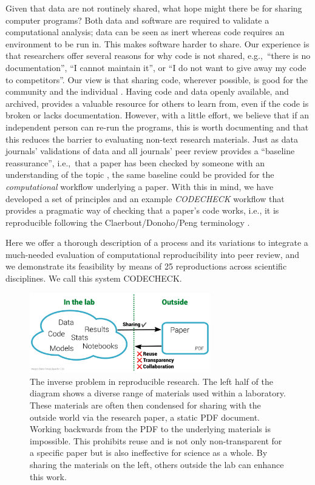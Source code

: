 \documentclass[12pt]{article}
\newcommand{\rev}[1]{\textit{#1}}
\begin{document}
Given that data are not routinely shared, what hope might there be for
sharing computer programs?  Both data and software are required to
validate a computational analysis; data can be seen as inert whereas
code requires an environment to be run in.  This makes software harder
to share.  Our experience is that researchers offer several reasons
for why code is not shared, e.g.,~``there is no documentation'', ``I
cannot maintain it'', or ``I do not want to give away my code to
competitors''.  Our view is that sharing code, wherever possible, is
good for the community and the individual
\cite{Barnes2010-iv,markowetz_five_2015}.  Having code and data openly
available, and archived, provides a valuable resource for others to
learn from, even if the code is broken or lacks documentation.
However, with a little effort, we believe that if an independent
person can re-run the programs, this is worth documenting and that
this reduces the barrier to evaluating non-text research materials.
Just as data journals' validations of data and all journals' peer
review provides a ``baseline reassurance'', i.e.,~that a paper has
been checked by someone with an understanding of the topic
\cite{fyfe_mission_2019}, the same baseline could be provided for the
\rev{computational} workflow underlying a paper.  With this in mind, we have developed a
set of principles and an example \rev{CODECHECK} workflow that provides a pragmatic
way of checking that a paper's code works, i.e., it is reproducible
following the Claerbout/Donoho/Peng terminology
\cite{barba_terminologies_2018}.

Here we offer a thorough description of a process and its variations
to integrate a much-needed evaluation of computational reproducibility
into peer review, and we demonstrate its feasibility by means of 25
reproductions across scientific disciplines.  We call this system
CODECHECK.

\begin{figure}
  \centering
  \includegraphics[width=0.7\textwidth]{figs/rr.pdf}
  \caption{The inverse problem in reproducible research. The left
  half of the diagram shows a diverse range of materials used
  within a laboratory. These materials are often then
  condensed for sharing with the outside world via the
  research paper, a static PDF document. Working backwards from the
  PDF to the underlying materials is impossible. This prohibits reuse
  and is not only non-transparent for a specific paper but is also 
  ineffective for science as a whole. By sharing the
  materials on the left, others outside the lab can enhance this work.}
  \label{fig:inverse}
\end{figure}
\end{document}
